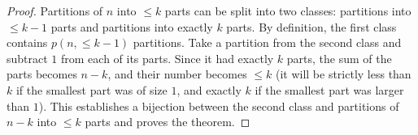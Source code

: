 \begin{proof}
Partitions of $n$ into $\le k$ parts can be split into two classes:
partitions into $\le k-1$ parts and partitions into exactly $k$ parts.
By definition, the first class contains $p(n, \le k-1)$ partitions.
Take a partition from the second class and subtract $1$ from each of its parts.
Since it had exactly $k$ parts, the sum of the parts becomes $n-k$,
and their number becomes $\le k$ (it will be strictly less than $k$ if the smallest part was of size $1$,
and exactly $k$ if the smallest part was larger than $1$).
This establishes a bijection between the second class and partitions of $n-k$ into $\le k$ parts
and proves the theorem.
\end{proof}